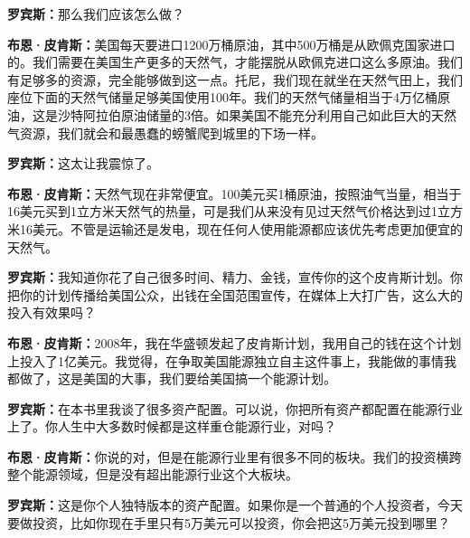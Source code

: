 \begin{BookQuote}
\textbf{罗宾斯：}那么我们应该怎么做？
\end{BookQuote}

\begin{BookQuote}
\textbf{布恩·皮肯斯：}美国每天要进口1200万桶原油，其中500万桶是从欧佩克国家进口的。我们需要在美国生产更多的天然气，才能摆脱从欧佩克进口这么多原油。我们有足够多的资源，完全能够做到这一点。托尼，我们现在就坐在天然气田上，我们座位下面的天然气储量足够美国使用100年。我们的天然气储量相当于4万亿桶原油，这是沙特阿拉伯原油储量的3倍。如果美国不能充分利用自己如此巨大的天然气资源，我们就会和最愚蠢的螃蟹爬到城里的下场一样。
\end{BookQuote}

\begin{BookQuote}
\textbf{罗宾斯：}这太让我震惊了。
\end{BookQuote}

\begin{BookQuote}
\textbf{布恩·皮肯斯：}天然气现在非常便宜。100美元买1桶原油，按照油气当量，相当于16美元买到1立方米天然气的热量，可是我们从来没有见过天然气价格达到过1立方米16美元。不管是运输还是发电，现在任何人使用能源都应该优先考虑更加便宜的天然气。
\end{BookQuote}

\begin{BookQuote}
\textbf{罗宾斯：}我知道你花了自己很多时间、精力、金钱，宣传你的这个皮肯斯计划。你把你的计划传播给美国公众，出钱在全国范围宣传，在媒体上大打广告，这么大的投入有效果吗？
\end{BookQuote}

\begin{BookQuote}
\textbf{布恩·皮肯斯：}2008年，我在华盛顿发起了皮肯斯计划，我用自己的钱在这个计划上投入了1亿美元。我觉得，在争取美国能源独立自主这件事上，我能做的事情我都做了，这是美国的大事，我们要给美国搞一个能源计划。
\end{BookQuote}

\begin{BookQuote}
\textbf{罗宾斯：}在本书里我谈了很多资产配置。可以说，你把所有资产都配置在能源行业上了。你人生中大多数时候都是这样重仓能源行业，对吗？
\end{BookQuote}

\begin{BookQuote}
\textbf{布恩·皮肯斯：}你说的对，但是在能源行业里有很多不同的板块。我们的投资横跨整个能源领域，但是没有超出能源行业这个大板块。
\end{BookQuote}

\begin{BookQuote}
\textbf{罗宾斯：}这是你个人独特版本的资产配置。如果你是一个普通的个人投资者，今天要做投资，比如你现在手里只有5万美元可以投资，你会把这5万美元投到哪里？
\end{BookQuote}

